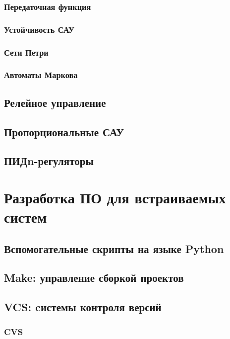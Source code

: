 \section{Передаточная функция}

\section{Устойчивость САУ}

\section{Сети Петри}

\section{Автоматы Маркова}

\chapter{Релейное управление}

\chapter{Пропорциональные САУ}

\chapter{ПИДn-регуляторы}

\part{Разработка ПО для встраиваемых систем}

\chapter{Вспомогательные скрипты на языке Python}

\chapter{Make: управление сборкой проектов}

\chapter{VCS: cистемы контроля версий}

\section{CVS}

